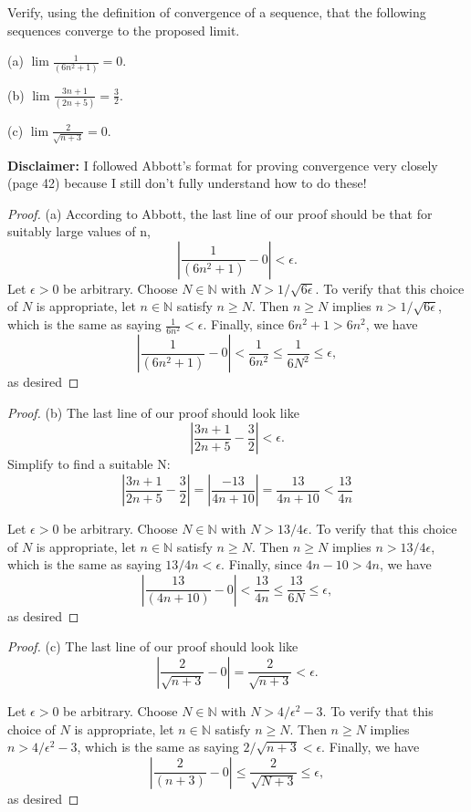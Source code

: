 \documentclass[12pt]{article}
\newcommand{\N}{\mathbb{N}}
\newenvironment{exercise}[2][Exercise]{\begin{trivlist}
\item[\hskip \labelsep {\bfseries #1}\hskip \labelsep {\bfseries #2.}]}{\end{trivlist}}
\begin{document}
\begin{exercise}{2.2.1}
Verify, using the definition of convergence of a sequence, that the following sequences converge to the proposed limit.

(a) $\lim \frac{1}{(6n^2 + 1)} = 0.$

(b) $\lim \frac{3n+1}{(2n + 5)} = \frac{3}{2}.$

(c) $\lim \frac{2}{\sqrt{n+3}} = 0.$
\end{exercise}

\noindent \textbf{Disclaimer:} I followed Abbott's format for proving convergence very closely (page 42) because I still don't fully understand how to do these!

\begin{proof} (a) According to Abbott, the last line of our proof should be that for suitably large values of n, $$\left|\frac{1}{(6n^2 + 1)}-0\right| < \epsilon.$$ Let $\epsilon > 0$ be arbitrary. Choose $N \in \N$ with $N > 1/\sqrt{6\epsilon}$. To verify that this choice of $N$ is appropriate, let $n \in \N$ satisfy $n \geq N$. Then $n \geq N$ implies $n > 1/\sqrt{6\epsilon}$, which is the same as saying $\frac{1}{6n^2} < \epsilon$. Finally, since $6n^2 + 1 > 6n^2$, we have  $$\left|\frac{1}{(6n^2 + 1)}-0\right| < \frac{1}{6n^2} \leq \frac{1}{6N^2} \leq \epsilon,$$ as desired
\end{proof}

\begin{proof}
\noindent (b) The last line of our proof should look like $$\left|\frac{3n+1}{2n + 5} - \frac{3}{2}\right| < \epsilon.$$ Simplify to find a suitable N: $$\left|\frac{3n+1}{2n + 5} - \frac{3}{2}\right| = \left|\frac{-13}{4n+10}\right| = \frac{13}{4n+10} < \frac{13}{4n}$$

Let $\epsilon > 0$ be arbitrary. Choose $N \in \N$ with $N > 13/4\epsilon$. To verify that this choice of $N$ is appropriate, let $n \in \N$ satisfy $n \geq N$. Then $n \geq N$ implies $n > 13/4\epsilon$, which is the same as saying $13/4n < \epsilon$. Finally, since $4n-10 > 4n$, we have  $$\left|\frac{13}{(4n+10)}-0\right| < \frac{13}{4n} \leq \frac{13}{6N} \leq \epsilon,$$ as desired
\end{proof}

\begin{proof}
\noindent (c) The last line of our proof should look like $$\left|\frac{2}{\sqrt{n+3}} - 0\right| = \frac{2}{\sqrt{n+3}} < \epsilon.$$ 

Let $\epsilon > 0$ be arbitrary. Choose $N \in \N$ with $N > 4/\epsilon^2 - 3$. To verify that this choice of $N$ is appropriate, let $n \in \N$ satisfy $n \geq N$. Then $n \geq N$ implies $n > 4/\epsilon^2 - 3$, which is the same as saying $2/\sqrt{n+3} < \epsilon$. Finally, we have  $$\left|\frac{2}{(n+3)}-0\right| \leq \frac{2}{\sqrt{N+3}} \leq \epsilon,$$ as desired
\end{proof}
\end{document}
